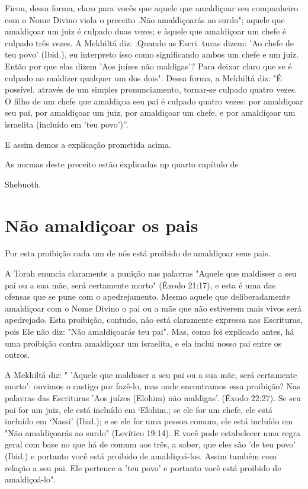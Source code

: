 \begin{itemize}
\begin{enumrate}
\begin{itemize}
\begin{itemize}
\begin{itemize}
Ficou, dessa forma, claro para vocês que aquele que amaldiçoar seu
companheiro com o Nome Divino viola o preceito .Não
amaldiçoarás ao surdo"; aquele que amaldiçoar um juiz é culpado duas
vezes; e àquele que amaldiçoar um chefe é culpado três vezes. A Mekhiltá
diz: .Quando as Escri­. turas dizem: 'Ao chefe de teu
povo' (Ibid.), eu interpreto isso como significan­do ambos um chefe e um
juiz. Então por que elas dizem 'Aos juízes não maldi­gas'? Para deixar
claro que se é culpado ao maldizer qualquer um dos dois". Dessa forma, a
Mekhiltá diz: "É possível, através de um simples pronuncia­mento,
tornar-se culpado quatro vezes. O filho de um chefe que amaldiçoa seu
pai é culpado quatro vezes: por amaldiçoar seu pai, por amaldiçoar um
juiz, por amaldiçoar um chefe, e por amaldiçoar um israelita (incluído
em 'teu povo')''.

E assim demos a explicação prometida acima.


As normas deste preceito estão explicadas np quarto capítulo de


Shebuoth.

\section{Não amaldiçoar os pais}


Por esta proibição cada um de nós está proibido de amaldiçoar seus pais.


A Torah enuncia claramente a punição nas palavras "Aquele que mal­disser
a seu pai ou a sua mãe, será certamente morto" (Êxodo 21:17), e esta é
uma das ofensas que se pune com o apedrejamento. Mesmo aquele que
deli­beradamente amaldiçoar com o Nome Divino o pai ou a mãe que não
estive­rem mais vivos será apedrejado. Esta proibição, contudo, não está
claramente expressa nas Escrituras, pois Ele não diz: "Não amaldiçoarás
teu pai". Mas, co­mo foi explicado antes, há uma proibição contra
amaldiçoar um israelita, e ela inclui nosso pai entre os outros.

A Mekhiltá diz: " 'Aquele que maldisser a seu pai ou a sua mãe, será
certamente morto': ouvimos o castigo por fazê-lo, mas onde encontramos
essa proibição? Nas palavras das Escrituras 'Aos juízes (Elohim) não
maldigas'. (Êxo­do 22:27). Se seu pai for um juiz, ele está incluído em
`Elohim.; se ele for um chefe, ele está incluído em
`Nassi' (Ibid.); e se ele for uma pessoa comum, ele está incluído em
"Não amaldiçoarás ao surdo" (Levítico 19:14). E você pode estabelecer
uma regra geral com base no que há de comum aos três, a saber, que eles
são 'de teu povo' (Ibid.) e portanto você está proibido de
amaldiçoá-los. Assim também com relação a seu pai. Ele pertence a 'teu
povo' e portanto você está proibido de amaldiçoá-lo".


\end{itemize}
\end{itemize}
\end{itemize}
\end{enumrate}
\end{itemize}
